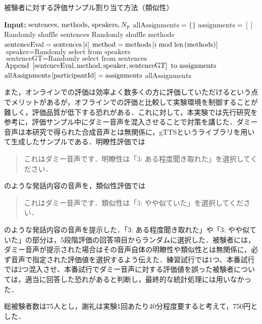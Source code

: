 \begin{algorithm}
    \caption{被験者に対する評価サンプル割り当て方法（類似性）}
    \label{sec4:algo:sample-assignment-sim}
    \begin{algorithmic}[1]
        \State \textbf{Input:} $\text{sentences, methods, speakers}, N_{\text{p}}$
        \State $\text{allAssignments} = \{\}$
        \State $\text{assignments} = []$
        \State $\text{Randomly shuffle sentences}$
        \State $\text{Randomly shuffle methods}$
        \State $\text{sentenceEval} = \text{sentences}\left[i\right]$
        \State $\text{method} = \text{methods}\left[i \bmod \text{len}\left(\text{methods}\right)\right]$
        \State $\text{speaker} = \text{Randomly select from speakers}$
        \State $\text{sentenceGT} = \text{Randomly select from sentences}$
        \State $\text{Append } \left[\text{sentenceEval}, \text{method}, \text{speaker}, \text{sentenceGT}\right] \text{ to assignments}$
        \EndFor
        \State $\text{allAssignments}\left[\text{participantId}\right] = \text{assignments}$
        \EndFor
        \State \Return $\text{allAssignments}$
    \end{algorithmic}
\end{algorithm}

また，オンラインでの評価は効率よく数多くの方に評価していただけるという点でメリットがあるが，オフラインでの評価と比較して実験環境を制御することが難しく，評価品質が低下する恐れがある．これに対して，本実験では先行研究\cite{kirkland2023stuck}を参考に，評価サンプル中にダミー音声を混入させることで対策を講じた．ダミー音声は本研究で得られた合成音声とは無関係に，gTTSというライブラリを用いて生成したサンプルである．明瞭性評価では
\begin{quote}
    これはダミー音声です．明瞭性は「3: ある程度聞き取れた」を選択してください．
\end{quote}
のような発話内容の音声を，類似性評価では
\begin{quote}
    これはダミー音声です．類似性は「3: やや似ていた」を選択してください．
\end{quote}
のような発話内容の音声を提示した．「3: ある程度聞き取れた」や「3: やや似ていた」の部分は，5段階評価の回答項目からランダムに選択した．被験者には，ダミー音声が提示された場合はその音声自体の明瞭性や類似性とは無関係に，必ず音声で指定された評価値を選択するよう伝えた．練習試行では1つ、本番試行では2つ混入させ、本番試行でダミー音声に対する評価値を誤った被験者については，適当に回答した恐れがあると判断し，最終的な統計処理には用いなかった．

総被験者数は75人とし，謝礼は実験1回あたり40分程度要すると考えて，750円とした．